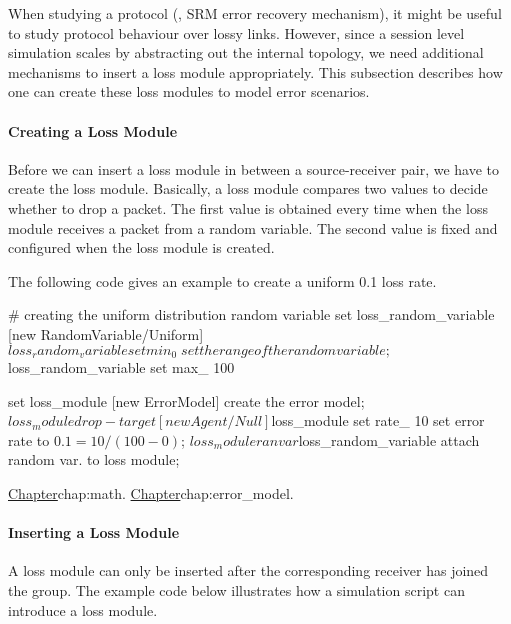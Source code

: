 When studying a protocol (\eg, SRM error recovery mechanism), 
it might be useful to study protocol behaviour over lossy links.
However, since a session level simulation scales by abstracting 
out the internal topology,
we need additional mechanisms to insert a loss module appropriately.
This subsection describes how one can create these loss modules to
model error scenarios.


\paragraph{Creating a Loss Module}
Before we can insert a loss module in between a source-receiver pair,
we have to create the loss module.  Basically,
a loss module compares two values to decide whether to drop a packet.
The first value is obtained every time when the loss module receives 
a packet from a random variable.  The second value
is fixed and configured when the loss module is created.

The following code gives an example to create a uniform 0.1 loss rate.
\begin{program}
        # {\cf creating the uniform distribution random variable}
        set loss_random_variable [new RandomVariable/Uniform] 
        $loss_random_variable set min_ 0 \; set the range of the random variable;
        $loss_random_variable set max_ 100

        set loss_module [new ErrorModel] \; create the error model;
        $loss_module drop-target [new Agent/Null] 
        $loss_module set rate_ 10 \; set error rate to \(0.1 = 10 / (100 - 0)\);
        $loss_module ranvar $loss_random_variable \; attach random var. to loss module;
\end{program}
\href{A catalogue of the random variable distributions was described earlier}{%
        Chapter}{chap:math}.
\href{A more detailed discussion of error models was also described earlier
in a different chapter}{Chapter}{chap:error_model}.

\paragraph{Inserting a Loss Module}
A loss module can only be inserted after the corresponding receiver
has joined the group.  The example code below illustrates how
a simulation script can introduce a loss module.

